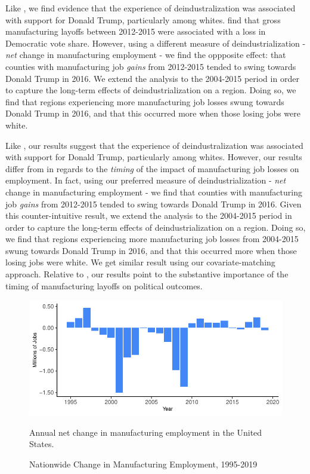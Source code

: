 \documentclass[]{AEA}
\begin{document}
Like \cite{Baccini21}, we find evidence that the experience of
deindustralization was associated with support for Donald Trump,
particularly among whites. \cite{Baccini21} find that gross
manufacturing layoffs between 2012-2015 were associated with a loss in
Democratic vote share. However, using a different measure of
deindustrialization - \emph{net} change in manufacturing employment - we
find the oppposite effect: that counties with manufacturing job
\emph{gains} from 2012-2015 tended to swing towards Donald Trump in
2016. We extend the analysis to the 2004-2015 period in order to capture
the long-term effects of deindustrialization on a region. Doing so, we
find that regions experiencing more manufacturing job losses swung
towards Donald Trump in 2016, and that this occurred more when those
losing jobs were white.

Like \cite{Baccini21}, our results suggest that the experience of
deindustralization was associated with support for Donald Trump,
particularly among whites. However, our results differ from
\cite{Baccini21} in regards to the \emph{timing} of the impact of
manufacturing job losses on employment. In fact, using our preferred
measure of deindustrialization - \emph{net} change in manufacturing
employment - we find that counties with manufacturing job \emph{gains}
from 2012-2015 tended to swing towards Donald Trump in 2016. Given this
counter-intuitive result, we extend the analysis to the 2004-2015 period
in order to capture the long-term effects of deindustrialization on a
region. Doing so, we find that regions experiencing more manufacturing
job losses from 2004-2015 swung towards Donald Trump in 2016, and that
this occurred more when those losing jobs were white. We get similar
result using our covariate-matching approach. Relative to
\cite{Baccini21}, our results point to the substantive importance of the
timing of manufacturing layoffs on political outcomes.

\FloatBarrier
\begin{figure} \label{natlPlotTS}
\caption{Nationwide Change in Manufacturing Employment, 1995-2019}

\begin{center}\includegraphics{Final-Draft_files/figure-latex/unnamed-chunk-3-1} \end{center}



\FloatBarrier
\begin{figurenotes}
Annual net change in manufacturing employment in the United States. 
\end{figurenotes}
\end{figure}
\FloatBarrier
\end{document}
